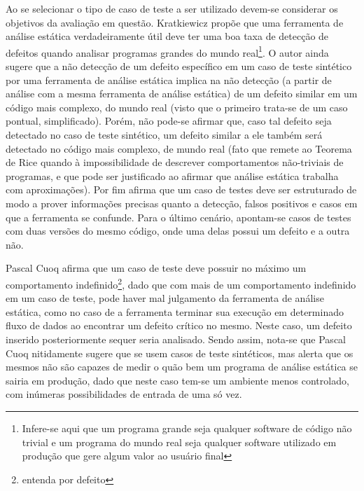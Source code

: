   Ao se selecionar o tipo de caso de teste a ser utilizado devem-se considerar os objetivos da avaliação em questão. Kratkiewicz \cite{harvard} propõe que uma ferramenta de análise estática verdadeiramente útil deve ter uma boa taxa de detecção de defeitos quando  analisar programas grandes do mundo real\footnote{Infere-se aqui que um programa grande seja qualquer software de código não trivial e um programa do mundo real seja qualquer software utilizado em produção que gere algum valor ao usuário final}. O autor ainda sugere que a não detecção de um defeito específico em um caso de teste sintético por uma ferramenta de análise estática implica na não detecção (a partir de análise com a mesma ferramenta de análise estática) de um defeito similar em um código mais complexo, do mundo real (visto que o primeiro trata-se de um caso pontual, simplificado). Porém, não pode-se afirmar que, caso tal defeito seja detectado no caso de teste sintético, um defeito similar a ele também será detectado no código mais complexo, de mundo real (fato que remete ao Teorema de Rice \cite{rice} quando à impossibilidade de descrever comportamentos não-triviais de programas, e que pode ser justificado ao afirmar que análise estática trabalha com aproximações). Por fim \cite{harvard} afirma que um caso de testes deve ser estruturado de modo a prover informações precisas quanto a detecção, falsos positivos e casos em que a ferramenta se confunde. Para o último cenário, apontam-se casos de testes com duas versões do mesmo código, onde uma delas possui um defeito e a outra não.

  Pascal Cuoq \cite{pascal} afirma que um caso de teste deve possuir no máximo um comportamento indefinido\footnote{entenda por defeito}, dado que com mais de um comportamento indefinido em um caso de teste, pode haver mal julgamento da ferramenta de análise estática, como no caso de a ferramenta terminar sua execução em determinado fluxo de dados ao encontrar um defeito crítico no mesmo. Neste caso, um defeito inserido posteriormente sequer seria analisado. Sendo assim, nota-se que Pascal Cuoq nitidamente sugere que se usem casos de teste sintéticos, mas alerta que os mesmos não são capazes de medir o quão bem um programa de análise estática se sairia em produção, dado que neste caso tem-se um ambiente menos controlado, com inúmeras possibilidades de entrada de uma só vez.

